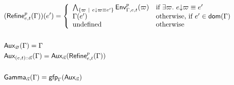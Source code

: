 \documentclass[a4paper]{article}
\theoremstyle{definition}
\begin{document}
    \begin{align*}
      &(\textsf{Refine}^{p}_{e,t}(\Gamma))(e') = 
        \left\{\begin{array}{ll}
          \bigwedge_{\{\varpi ~|~ e{\downarrow}\varpi \equiv e'\}} \textsf{Env}^{p}_{\Gamma,e,t} (\varpi) & \text{if } \exists \varpi.\ e{\downarrow}\varpi \equiv e' \\
          \Gamma(e') & \text{otherwise, if } e' \in \textsf{dom}(\Gamma)\\
          \text{undefined} & \text{otherwise}
        \end{array}\right.\\&\\
      &\textsf{Aux}_{\varnothing}(\Gamma) = \Gamma\\
      &\textsf{Aux}_{{(e,t)}\textsf{::}{\vec \alpha}}(\Gamma) = \textsf{Aux}_{\vec \alpha}(\textsf{Refine}^{p}_{e,t}(\Gamma))\\&\\
      &\textsf{Gamma}_{\vec \alpha}(\Gamma)=\textsf{gfp}_\Gamma (\textsf{Aux}_{\vec \alpha})
    \end{align*}
\end{document}
